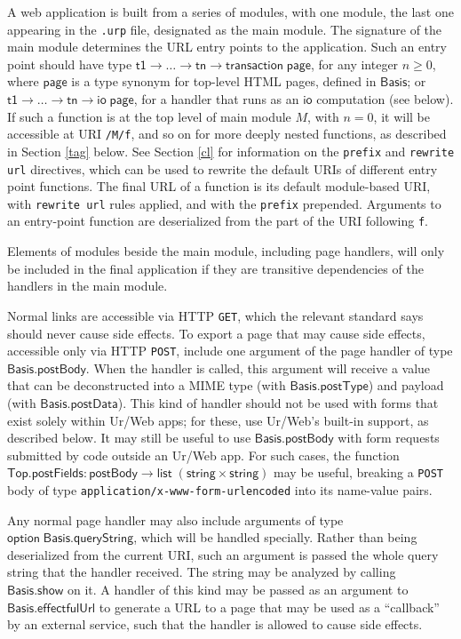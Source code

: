 \documentclass{article}
\newcommand{\mt}[1]{\mathsf{#1}}
\begin{document}
A web application is built from a series of modules, with one module, the last one appearing in the \texttt{.urp} file, designated as the main module.  The signature of the main module determines the URL entry points to the application.  Such an entry point should have type $\mt{t1} \to \ldots \to \mt{tn} \to \mt{transaction} \; \mt{page}$, for any integer $n \geq 0$, where $\mt{page}$ is a type synonym for top-level HTML pages, defined in $\mt{Basis}$; or $\mt{t1} \to \ldots \to \mt{tn} \to \mt{io} \; \mt{page}$, for a handler that runs as an $\mt{io}$ computation (see below).  If such a function is at the top level of main module $M$, with $n = 0$, it will be accessible at URI \texttt{/M/f}, and so on for more deeply nested functions, as described in Section \ref{tag} below.  See Section \ref{cl} for information on the \texttt{prefix} and \texttt{rewrite url} directives, which can be used to rewrite the default URIs of different entry point functions.  The final URL of a function is its default module-based URI, with \texttt{rewrite url} rules applied, and with the \texttt{prefix} prepended.  Arguments to an entry-point function are deserialized from the part of the URI following \texttt{f}.

Elements of modules beside the main module, including page handlers, will only be included in the final application if they are transitive dependencies of the handlers in the main module.

Normal links are accessible via HTTP \texttt{GET}, which the relevant standard says should never cause side effects.  To export a page that may cause side effects, accessible only via HTTP \texttt{POST}, include one argument of the page handler of type $\mt{Basis.postBody}$.  When the handler is called, this argument will receive a value that can be deconstructed into a MIME type (with $\mt{Basis.postType}$) and payload (with $\mt{Basis.postData}$).  This kind of handler should not be used with forms that exist solely within Ur/Web apps; for these, use Ur/Web's built-in support, as described below.  It may still be useful to use $\mt{Basis.postBody}$ with form requests submitted by code outside an Ur/Web app.  For such cases, the function $\mt{Top.postFields} : \mt{postBody} \to \mt{list} \; (\mt{string} \times \mt{string})$ may be useful, breaking a \texttt{POST} body of type \texttt{application/x-www-form-urlencoded} into its name-value pairs.

Any normal page handler may also include arguments of type $\mt{option \; Basis.queryString}$, which will be handled specially.  Rather than being deserialized from the current URI, such an argument is passed the whole query string that the handler received.  The string may be analyzed by calling $\mt{Basis.show}$ on it.  A handler of this kind may be passed as an argument to $\mt{Basis.effectfulUrl}$ to generate a URL to a page that may be used as a ``callback'' by an external service, such that the handler is allowed to cause side effects.
\end{document}
